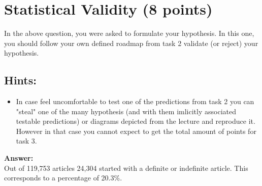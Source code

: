 \documentclass{WeSTassignment}
\begin{document}


\section{Statistical Validity (8 points)}
In the above question, you were asked to formulate your hypothesis. In this one, you should follow your own defined roadmap from task 2 validate (or reject) your hypothesis. 

\subsection{Hints:}
\begin{itemize}
\item In case feel uncomfortable to test one of the predictions from task 2 you can "steal" one of the many hypothesis (and with them imlicitly associated testable predictions) or diagrams depicted from the lecture and reproduce it. However in that case you cannot expect to get the total amount of points for task 3. 
\end{itemize}

\textbf{Answer:}
\\
Out of 119,753 articles 24,304 started with a definite or indefinite article. This corresponds to a percentage of 20.3\%.







\makefooter
\end{document}
